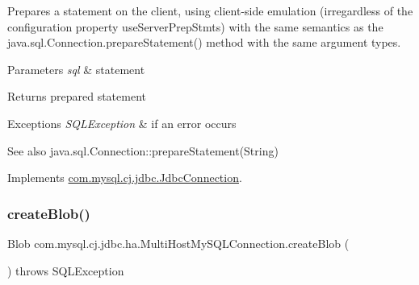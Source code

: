 Prepares a statement on the client, using client-\/side emulation (irregardless of the configuration property \textquotesingle{}use\+Server\+Prep\+Stmts\textquotesingle{}) with the same semantics as the java.\+sql.\+Connection.\+prepare\+Statement() method with the same argument types.


\begin{DoxyParams}{Parameters}
{\em sql} & statement \\
\hline
\end{DoxyParams}
\begin{DoxyReturn}{Returns}
prepared statement 
\end{DoxyReturn}

\begin{DoxyExceptions}{Exceptions}
{\em S\+Q\+L\+Exception} & if an error occurs \\
\hline
\end{DoxyExceptions}
\begin{DoxySeeAlso}{See also}
java.\+sql.\+Connection\+::prepare\+Statement(\+String) 
\end{DoxySeeAlso}


Implements \mbox{\hyperlink{interfacecom_1_1mysql_1_1cj_1_1jdbc_1_1_jdbc_connection_a62db1ccf7a070833775481acb5e9e359}{com.\+mysql.\+cj.\+jdbc.\+Jdbc\+Connection}}.

\mbox{\label{classcom_1_1mysql_1_1cj_1_1jdbc_1_1ha_1_1_multi_host_my_s_q_l_connection_afa12db3d982f85ec0e6102afe6cc44d3}} 
\subsubsection{\texorpdfstring{create\+Blob()}{createBlob()}}
{\footnotesize\ttfamily Blob com.\+mysql.\+cj.\+jdbc.\+ha.\+Multi\+Host\+My\+S\+Q\+L\+Connection.\+create\+Blob (\begin{DoxyParamCaption}{ }\end{DoxyParamCaption}) throws S\+Q\+L\+Exception}


